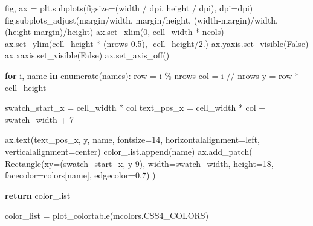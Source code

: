 \documentclass[
  letterpaper,
  DIV=11,
  numbers=noendperiod]{scrartcl}
\newenvironment{Shaded}{\begin{snugshade}}{\end{snugshade}}
\newcommand{\BuiltInTok}[1]{\textcolor[rgb]{0.00,0.23,0.31}{#1}}
\newcommand{\ControlFlowTok}[1]{\textcolor[rgb]{0.00,0.23,0.31}{\textbf{#1}}}
\newcommand{\DecValTok}[1]{\textcolor[rgb]{0.68,0.00,0.00}{#1}}
\newcommand{\FloatTok}[1]{\textcolor[rgb]{0.68,0.00,0.00}{#1}}
\newcommand{\KeywordTok}[1]{\textcolor[rgb]{0.00,0.23,0.31}{\textbf{#1}}}
\newcommand{\NormalTok}[1]{\textcolor[rgb]{0.00,0.23,0.31}{#1}}
\newcommand{\OperatorTok}[1]{\textcolor[rgb]{0.37,0.37,0.37}{#1}}
\newcommand{\StringTok}[1]{\textcolor[rgb]{0.13,0.47,0.30}{#1}}
\newcommand{\VariableTok}[1]{\textcolor[rgb]{0.07,0.07,0.07}{#1}}
\begin{document}
\begin{Shaded}
\begin{Highlighting}[]
\NormalTok{    fig, ax }\OperatorTok{=}\NormalTok{ plt.subplots(figsize}\OperatorTok{=}\NormalTok{(width }\OperatorTok{/}\NormalTok{ dpi, height }\OperatorTok{/}\NormalTok{ dpi), dpi}\OperatorTok{=}\NormalTok{dpi)}
\NormalTok{    fig.subplots\_adjust(margin}\OperatorTok{/}\NormalTok{width, margin}\OperatorTok{/}\NormalTok{height,}
\NormalTok{                        (width}\OperatorTok{{-}}\NormalTok{margin)}\OperatorTok{/}\NormalTok{width, (height}\OperatorTok{{-}}\NormalTok{margin)}\OperatorTok{/}\NormalTok{height)}
\NormalTok{    ax.set\_xlim(}\DecValTok{0}\NormalTok{, cell\_width }\OperatorTok{*}\NormalTok{ ncols)}
\NormalTok{    ax.set\_ylim(cell\_height }\OperatorTok{*}\NormalTok{ (nrows}\OperatorTok{{-}}\FloatTok{0.5}\NormalTok{), }\OperatorTok{{-}}\NormalTok{cell\_height}\OperatorTok{/}\FloatTok{2.}\NormalTok{)}
\NormalTok{    ax.yaxis.set\_visible(}\VariableTok{False}\NormalTok{)}
\NormalTok{    ax.xaxis.set\_visible(}\VariableTok{False}\NormalTok{)}
\NormalTok{    ax.set\_axis\_off()}

    \ControlFlowTok{for}\NormalTok{ i, name }\KeywordTok{in} \BuiltInTok{enumerate}\NormalTok{(names):}
\NormalTok{        row }\OperatorTok{=}\NormalTok{ i }\OperatorTok{\%}\NormalTok{ nrows}
\NormalTok{        col }\OperatorTok{=}\NormalTok{ i }\OperatorTok{//}\NormalTok{ nrows}
\NormalTok{        y }\OperatorTok{=}\NormalTok{ row }\OperatorTok{*}\NormalTok{ cell\_height}

\NormalTok{        swatch\_start\_x }\OperatorTok{=}\NormalTok{ cell\_width }\OperatorTok{*}\NormalTok{ col}
\NormalTok{        text\_pos\_x }\OperatorTok{=}\NormalTok{ cell\_width }\OperatorTok{*}\NormalTok{ col }\OperatorTok{+}\NormalTok{ swatch\_width }\OperatorTok{+} \DecValTok{7}

\NormalTok{        ax.text(text\_pos\_x, y, name, fontsize}\OperatorTok{=}\DecValTok{14}\NormalTok{,}
\NormalTok{                horizontalalignment}\OperatorTok{=}\StringTok{\textquotesingle{}left\textquotesingle{}}\NormalTok{,}
\NormalTok{                verticalalignment}\OperatorTok{=}\StringTok{\textquotesingle{}center\textquotesingle{}}\NormalTok{)}
\NormalTok{        color\_list.append(name)}
\NormalTok{        ax.add\_patch(}
\NormalTok{            Rectangle(xy}\OperatorTok{=}\NormalTok{(swatch\_start\_x, y}\OperatorTok{{-}}\DecValTok{9}\NormalTok{), width}\OperatorTok{=}\NormalTok{swatch\_width,}
\NormalTok{                      height}\OperatorTok{=}\DecValTok{18}\NormalTok{, facecolor}\OperatorTok{=}\NormalTok{colors[name], edgecolor}\OperatorTok{=}\StringTok{\textquotesingle{}0.7\textquotesingle{}}\NormalTok{)}
\NormalTok{        )}

    \ControlFlowTok{return}\NormalTok{ color\_list}

\NormalTok{color\_list }\OperatorTok{=}\NormalTok{ plot\_colortable(mcolors.CSS4\_COLORS)}
\end{Highlighting}
\end{Shaded}
\end{document}
